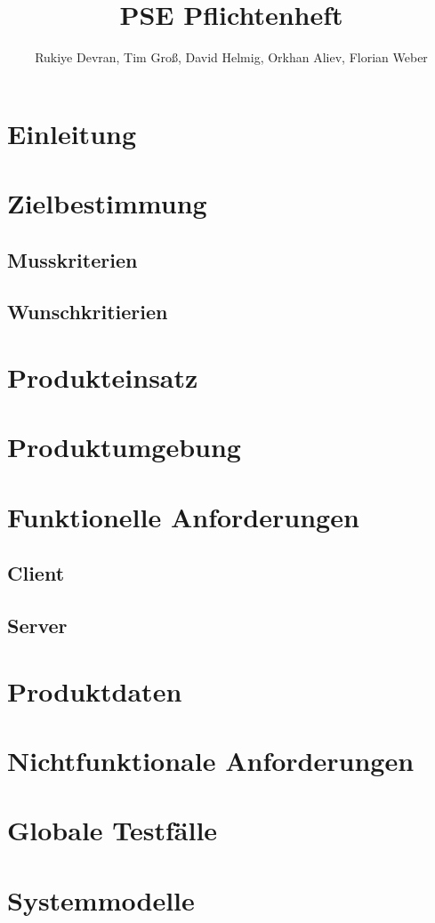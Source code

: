 \documentclass[parskip=full]{scrartcl}
\title{PSE Pflichtenheft}
\author{Rukiye Devran, Tim Groß, David Helmig, Orkhan Aliev, Florian Weber}
\begin{document}
	\begin{titlepage}
	\maketitle	
	\tableofcontents
	
	\end{titlepage}
\section{Einleitung}
\section{Zielbestimmung}
\subsection{Musskriterien}
\subsection{Wunschkritierien}
\section{Produkteinsatz}
\section{Produktumgebung}
\section{Funktionelle Anforderungen}
\subsection{Client}
\subsection{Server}
\section{Produktdaten}
\section{Nichtfunktionale Anforderungen}
\section{Globale Testfälle}
\section{Systemmodelle}
\end{document}
